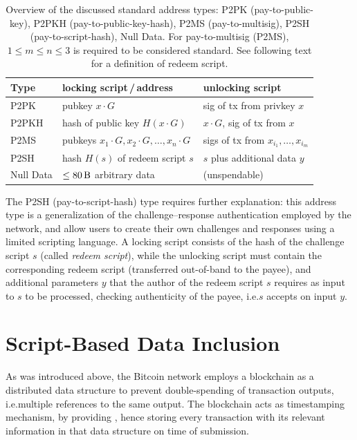 \documentclass[a4paper,11pt,titlepage]{scrbook}
\begin{document}
\begin{table}
    \renewcommand{\arraystretch}{1.2}
    \centering
    \begin{tabular}{lll}
        \toprule
        \textbf{Type} & \textbf{locking script\,/\,address} & \textbf{unlocking script} \\
        \midrule
        P2PK & pubkey $x\cdot G$ & sig of tx from privkey $x$ \\
        P2PKH & hash of public key $H(x\cdot G)$ & $x\cdot G$, sig of tx from $x$ \\
        P2MS & pubkeys $x_1{\cdot} G, x_2{\cdot} G, \dots, x_n{\cdot} G$ & sigs of tx from $x_{i_1}, \dots, x_{i_m}$ \\
        P2SH & hash $H(s)$ of redeem script $s$ & $s$ plus additional data $y$ \\
        Null Data & $\leq \SI{80}{\byte}$ arbitrary data & (unspendable)\\
        \bottomrule
    \end{tabular}
    \caption[Overview of the discussed standard address types]{Overview of the discussed standard address types: P2PK (pay-to-public-key), P2PKH (pay-to-public-key-hash), P2MS (pay-to-multisig), P2SH (pay-to-script-hash), Null Data. For pay-to-multisig (P2MS), $1\leq m\leq n\leq 3$ is required to be considered standard. See following text for a definition of redeem script.}
    \label{table:script-types}
\end{table}

The P2SH (pay-to-script-hash) type requires further explanation: this address type is a generalization of the challenge–response authentication employed by the network, and allow users to create their own challenges and responses using a limited scripting language.
A locking script consists of the hash of the challenge script $s$ (called \emph{redeem script}), while the unlocking script must contain the corresponding redeem script (transferred out-of-band to the payee), and additional parameters $y$ that the author of the redeem script $s$ requires as input to $s$ to be processed, checking authenticity of the payee, i.e.\@ $s$ accepts on input $y$.




\section{Script-Based Data Inclusion}\label{sec:fakekeys}

As was introduced above, the Bitcoin network employs a blockchain as a distributed data structure to prevent double-spending of transaction outputs, i.e.\@ multiple references to the same output.
The blockchain acts as timestamping mechanism, by providing , hence storing every transaction with its relevant information in that data structure on time of submission.
\end{document}
